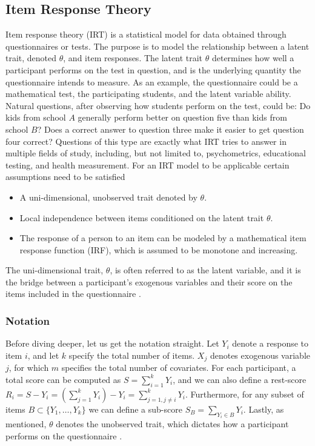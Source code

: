 \documentclass[a4project,12pt]{article}
\theoremstyle{examplestyle}
\theoremstyle{defstyle}
\theoremstyle{thmstyle}
\begin{document}
\subsection{Item Response Theory}
Item response theory (IRT) is a statistical model for data obtained through questionnaires or tests. The purpose is to model the relationship between a latent trait, denoted $\theta$, and item responses. The latent trait $\theta$ determines how well a participant performs on the test in question, and is the underlying quantity the questionnaire intends to measure.
As an example, the questionnaire could be a mathematical test, the participating students, and the latent variable ability. Natural questions, after observing how students perform on the test, could be: Do kids from school $A$ generally perform better on question five than kids from school $B$? Does a correct answer to question three make it easier to get question four correct? Questions of this type are exactly what IRT tries to answer in multiple fields of study, including, but not limited to, psychometrics, educational testing, and health measurement. For an IRT model to be applicable certain assumptions need to be satisfied
\begin{itemize}
    \item A uni-dimensional, unobserved trait denoted by $\theta$.
    \item Local independence between items conditioned on the latent trait $\theta$.
    \item The response of a person to an item can be modeled by a mathematical item response function (IRF), which is assumed to be monotone and increasing. 
\end{itemize}
The uni-dimensional trait, $\theta$, is often referred to as the latent variable, and it is the bridge between a participant's exogenous variables and their score on the items included in the questionnaire \cite{van-der-linden-hambleton-1997}. 

\subsubsection{Notation}
Before diving deeper, let us get the notation straight. Let $Y_i$ denote a response to item $i$, and let $k$ specify the total number of items. $X_j$ denotes exogenous variable $j$, for which $m$ specifies the total number of covariates. For each participant, a total score can be computed as $S=\sum_{i=1}^k Y_i$, and we can also define a rest-score $R_i=S-Y_i=\left(\sum_{j=1}^kY_i\right)-Y_i = \sum_{j=1,j\neq i}^kY_i$. Furthermore, for any subset of items $B\subset\{Y_1,\dots,Y_k\}$ we can define a sub-score $S_B=\sum_{Y_i\in B}Y_i$. Lastly, as mentioned, $\theta$ denotes the unobserved trait, which dictates how a participant performs on the questionnaire \cite{kreiner-christensen-2011}. 
\end{document}
